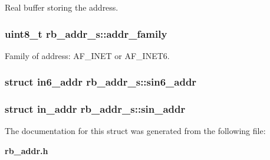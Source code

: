 Real buffer storing the address. 

\subsubsection[{addr\+\_\+family}]{\setlength{\rightskip}{0pt plus 5cm}uint8\+\_\+t rb\+\_\+addr\+\_\+s\+::addr\+\_\+family}\label{structrb__addr__s_a0eab82f9cdc545c452068f24a8f64cc1}


Family of address\+: A\+F\+\_\+\+I\+N\+E\+T or A\+F\+\_\+\+I\+N\+E\+T6. 

\subsubsection[{sin6\+\_\+addr}]{\setlength{\rightskip}{0pt plus 5cm}struct in6\+\_\+addr rb\+\_\+addr\+\_\+s\+::sin6\+\_\+addr}\label{structrb__addr__s_a272dcafb5295c1f8d999f860a96b2fd5}
\subsubsection[{sin\+\_\+addr}]{\setlength{\rightskip}{0pt plus 5cm}struct in\+\_\+addr rb\+\_\+addr\+\_\+s\+::sin\+\_\+addr}\label{structrb__addr__s_ac26433c8034f129ed3f06f44e63df305}


The documentation for this struct was generated from the following file\+:\begin{DoxyCompactItemize}
\item 
{\bf rb\+\_\+addr.\+h}\end{DoxyCompactItemize}
